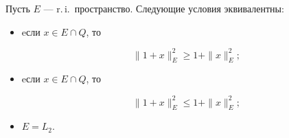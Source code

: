 \begin{thm}\label{t1}


Пусть $E$ --- r.\,i.\ пространство. Следующие условия эквивалентны\/${:}$


\begin{itemize}


\item[i)] eсли $x\in E \cap Q$, то


\begin{equation}\label{e8}


\|1 + x\|_E^2 \ge 1 + \|x\|_E^2;


\end{equation}


\item[ii)] eсли $x\in E \cap Q$, то


\begin{equation}\label{e9}


\|1 + x\|_E^2 \le 1 + \|x\|_E^2;


\end{equation}


\item[iii)] $E=L_2$. 


\end{itemize}


\end{thm}





